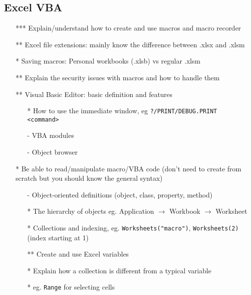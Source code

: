 \documentclass[12pt]{article}%
\begin{document}
\subsection*{Excel VBA}
\begin{itemize}
 \setlength{\itemsep}{1pt}%
    \setlength{\parskip}{1pt}
\item[***] Explain/understand how to create and use macros and macro recorder
\item[**] Excel file extensions: mainly know the difference between .xlsx and .xlsm
\item[*] Saving macros: Personal workbooks (.xlsb) vs regular .xlsm
\item[**] Explain the security issues with macros and how to handle them
\item[**] Visual Basic Editor: basic definition and features 
\begin{itemize}
\item[*] How to use the immediate window, eg \verb|?/PRINT/DEBUG.PRINT <command>| 
\item[-] VBA modules
\item[-] Object browser
\end{itemize}
\item[*] Be able to read/manipulate macro/VBA code (don't need to create from scratch but you should know the general syntax)
\begin{itemize}
\item[-]  Object-oriented definitions (object, class, property, method) %
\item[*] The hierarchy of objects eg. Application $\rightarrow$ Workbook $\rightarrow$ Worksheet
\item[*] Collections and indexing, eg. {\tt Worksheets("macro")}, {\tt Worksheets(2)} (index starting at 1)
\item[**] Create and use Excel variables
\item[*]  Explain how a collection is different from a typical variable
\item[*] eg. {\tt Range} for selecting cells
\end{itemize}

\end{itemize}
\end{document}
